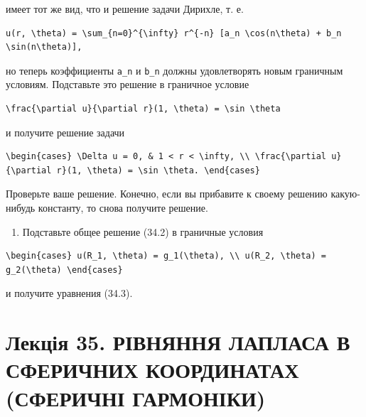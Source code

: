 \documentclass[
  ukrainian,
]{article}
\providecommand{\tightlist}{%
  \setlength{\itemsep}{0pt}\setlength{\parskip}{0pt}}
\begin{document}
имеет тот же вид, что и решение задачи Дирихле, т. е.

\begin{verbatim}
u(r, \theta) = \sum_{n=0}^{\infty} r^{-n} [a_n \cos(n\theta) + b_n \sin(n\theta)],
\end{verbatim}

но теперь коэффициенты \texttt{a\_n} и \texttt{b\_n} должны
удовлетворять новым граничным условиям. Подставьте это решение в
граничное условие

\begin{verbatim}
\frac{\partial u}{\partial r}(1, \theta) = \sin \theta
\end{verbatim}

и получите решение задачи

\begin{verbatim}
\begin{cases} \Delta u = 0, & 1 < r < \infty, \\ \frac{\partial u}{\partial r}(1, \theta) = \sin \theta. \end{cases}
\end{verbatim}

Проверьте ваше решение. Конечно, если вы прибавите к своему решению
какую-нибудь константу, то снова получите решение.

\begin{enumerate}
\def\labelenumi{\arabic{enumi}.}
\setcounter{enumi}{3}
\tightlist
\item
  Подставьте общее решение (34.2) в граничные условия
\end{enumerate}

\begin{verbatim}
\begin{cases} u(R_1, \theta) = g_1(\theta), \\ u(R_2, \theta) = g_2(\theta) \end{cases}
\end{verbatim}

и получите уравнения (34.3).

\section{Лекція 35. РІВНЯННЯ ЛАПЛАСА В СФЕРИЧНИХ КООРДИНАТАХ (СФЕРИЧНІ
ГАРМОНІКИ)}\label{ux43bux435ux43aux446ux456ux44f-35.-ux440ux456ux432ux43dux44fux43dux43dux44f-ux43bux430ux43fux43bux430ux441ux430-ux432-ux441ux444ux435ux440ux438ux447ux43dux438ux445-ux43aux43eux43eux440ux434ux438ux43dux430ux442ux430ux445-ux441ux444ux435ux440ux438ux447ux43dux456-ux433ux430ux440ux43cux43eux43dux456ux43aux438}
\end{document}
